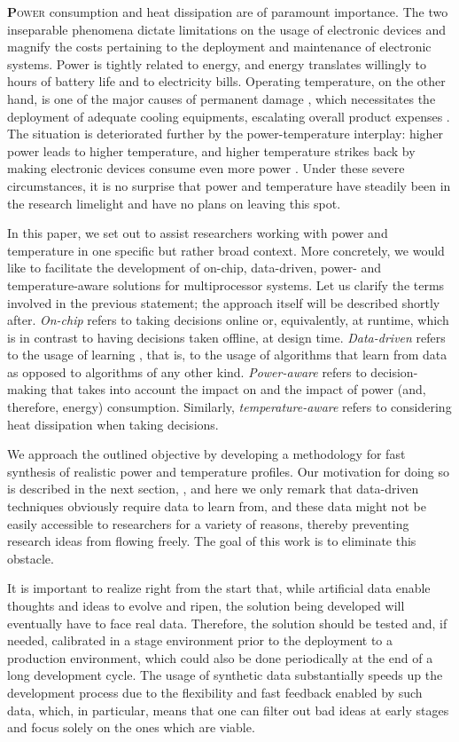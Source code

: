 \lettrine[findent=0.4em, nindent=0em]{\textbf{P}}{ower} consumption and heat
dissipation are of paramount importance. The two inseparable phenomena dictate
limitations on the usage of electronic devices and magnify the costs pertaining
to the deployment and maintenance of electronic systems. Power is tightly
related to energy, and energy translates willingly to hours of battery life and
to electricity bills. Operating temperature, on the other hand, is one of the
major causes of permanent damage \cite{jedec}, which necessitates the deployment
of adequate cooling equipments, escalating overall product expenses
\cite{chaudhry2015}. The situation is deteriorated further by the
power-temperature interplay: higher power leads to higher temperature, and
higher temperature strikes back by making electronic devices consume even more
power \cite{liu2007}. Under these severe circumstances, it is no surprise that
power and temperature have steadily been in the research limelight and have no
plans on leaving this spot.

In this paper, we set out to assist researchers working with power and
temperature in one specific but rather broad context. More concretely, we would
like to facilitate the development of on-chip, data-driven, power- and
temperature-aware solutions for multiprocessor systems. Let us clarify the terms
involved in the previous statement; the approach itself will be described
shortly after. \emph{On-chip} refers to taking decisions online or,
equivalently, at runtime, which is in contrast to having decisions taken
offline, at design time. \emph{Data-driven} refers to the usage of learning
\cite{bishop2006}, that is, to the usage of algorithms that learn from data as
opposed to algorithms of any other kind. \emph{Power-aware} refers to
decision-making that takes into account the impact on and the impact of power
(and, therefore, energy) consumption. Similarly, \emph{temperature-aware} refers
to considering heat dissipation when taking decisions.

We approach the outlined objective by developing a methodology for fast
synthesis of realistic power and temperature profiles. Our motivation for doing
so is described in the next section, , and here we only remark
that data-driven techniques obviously require data to learn from, and these data
might not be easily accessible to researchers for a variety of reasons, thereby
preventing research ideas from flowing freely. The goal of this work is to
eliminate this obstacle.

It is important to realize right from the start that, while artificial data
enable thoughts and ideas to evolve and ripen, the solution being developed will
eventually have to face real data. Therefore, the solution should be tested and,
if needed, calibrated in a stage environment prior to the deployment to a
production environment, which could also be done periodically at the end of a
long development cycle. The usage of synthetic data substantially speeds up the
development process due to the flexibility and fast feedback enabled by such
data, which, in particular, means that one can filter out bad ideas at early
stages and focus solely on the ones which are viable.

